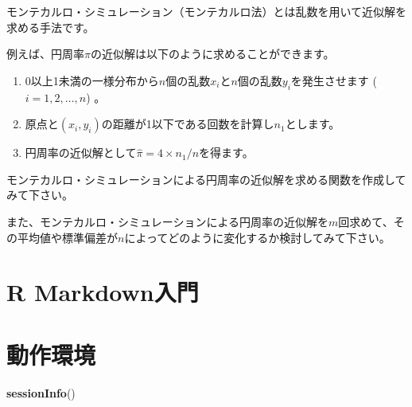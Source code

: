 \documentclass[]{bxjsarticle}
\newenvironment{Shaded}{\begin{snugshade}}{\end{snugshade}}
\newcommand{\KeywordTok}[1]{\textcolor[rgb]{0.13,0.29,0.53}{\textbf{#1}}}
\newcommand{\NormalTok}[1]{#1}
\providecommand{\tightlist}{%
  \setlength{\itemsep}{0pt}\setlength{\parskip}{0pt}}
\begin{document}
モンテカルロ・シミュレーション（モンテカルロ法）とは乱数を用いて近似解を求める手法です。

例えば、円周率\(\pi\)の近似解は以下のように求めることができます。

\begin{enumerate}
\def\labelenumi{\arabic{enumi}.}
\tightlist
\item
  0以上1未満の一様分布から\(n\)個の乱数\(x_i\)と\(n\)個の乱数\(y_i\)を発生させます (\(i = 1,2,\ldots,n\)) 。
\item
  原点と\((x_i,y_i)\)の距離が1以下である回数を計算し\(n_1\)とします。
\item
  円周率の近似解として\(\hat{\pi} = 4 \times n_1/n\)を得ます。
\end{enumerate}

モンテカルロ・シミュレーションによる円周率の近似解を求める関数を作成してみて下さい。

また、モンテカルロ・シミュレーションによる円周率の近似解を\(m\)回求めて、その平均値や標準偏差が\(n\)によってどのように変化するか検討してみて下さい。

\hypertarget{rmakdown}{%
\section{R Markdown入門}\label{rmakdown}}

\hypertarget{environment}{%
\section*{動作環境}\label{environment}}

\begin{Shaded}
\begin{Highlighting}[]
\KeywordTok{sessionInfo}\NormalTok{()}
\end{Highlighting}
\end{Shaded}
\end{document}
